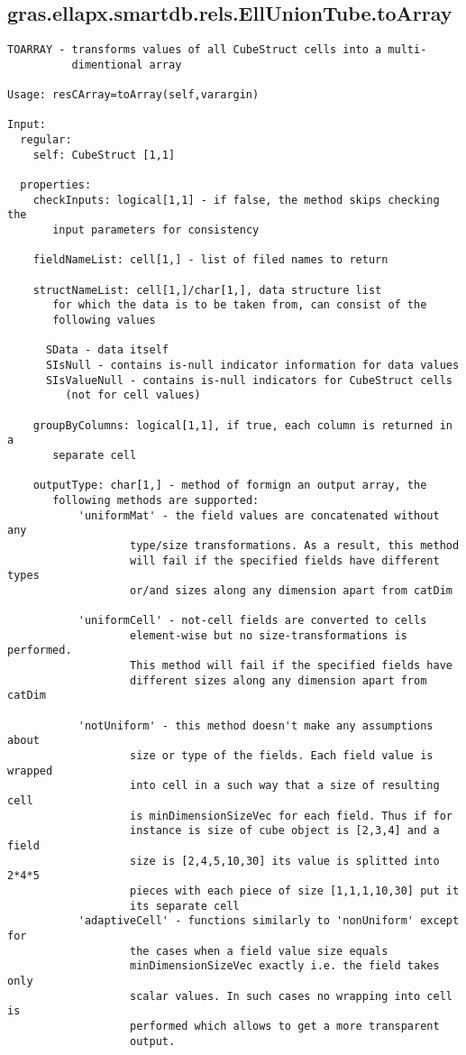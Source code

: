 \subsection{\texorpdfstring{gras.ellapx.smartdb.rels.EllUnionTube.toArray}{toArray}}\label{method:gras.ellapx.smartdb.rels.EllUnionTube.toArray}
\begin{verbatim}
TOARRAY - transforms values of all CubeStruct cells into a multi-
          dimentional array

Usage: resCArray=toArray(self,varargin)

Input:
  regular:
    self: CubeStruct [1,1]

  properties:
    checkInputs: logical[1,1] - if false, the method skips checking the
       input parameters for consistency

    fieldNameList: cell[1,] - list of filed names to return

    structNameList: cell[1,]/char[1,], data structure list
       for which the data is to be taken from, can consist of the
       following values

      SData - data itself
      SIsNull - contains is-null indicator information for data values
      SIsValueNull - contains is-null indicators for CubeStruct cells
         (not for cell values)

    groupByColumns: logical[1,1], if true, each column is returned in a
       separate cell

    outputType: char[1,] - method of formign an output array, the
       following methods are supported:
           'uniformMat' - the field values are concatenated without any
                   type/size transformations. As a result, this method
                   will fail if the specified fields have different types
                   or/and sizes along any dimension apart from catDim

           'uniformCell' - not-cell fields are converted to cells
                   element-wise but no size-transformations is performed.
                   This method will fail if the specified fields have
                   different sizes along any dimension apart from catDim

           'notUniform' - this method doesn't make any assumptions about
                   size or type of the fields. Each field value is wrapped
                   into cell in a such way that a size of resulting cell
                   is minDimensionSizeVec for each field. Thus if for
                   instance is size of cube object is [2,3,4] and a field
                   size is [2,4,5,10,30] its value is splitted into 2*4*5
                   pieces with each piece of size [1,1,1,10,30] put it
                   its separate cell
           'adaptiveCell' - functions similarly to 'nonUniform' except for
                   the cases when a field value size equals
                   minDimensionSizeVec exactly i.e. the field takes only
                   scalar values. In such cases no wrapping into cell is
                   performed which allows to get a more transparent
                   output.


\end{verbatim}
